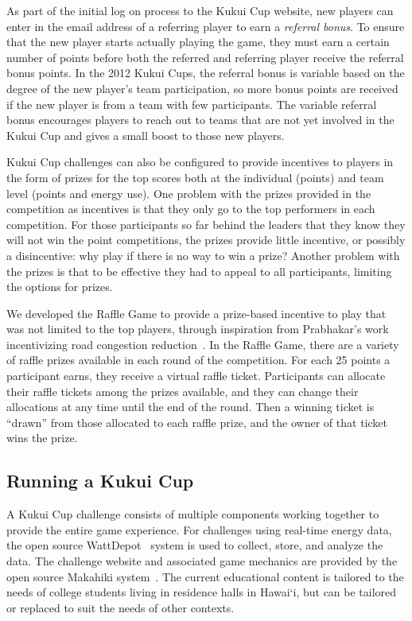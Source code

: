 \documentclass{sigchi}
\newcommand{\Hawaii}{Hawai`i\xspace}
\begin{document}
As part of the initial log on process to the Kukui Cup website, new players can enter in the email address of a referring player to earn a \emph{referral bonus}. To ensure that the new player starts actually playing the game, they must earn a certain number of points before both the referred and referring player receive the referral bonus points. In the 2012 Kukui Cups, the referral bonus is variable based on the degree of the new player's team participation, so more bonus points are received if the new player is from a team with few participants. The variable referral bonus encourages players to reach out to teams that are not yet involved in the Kukui Cup and gives a small boost to those new players.

Kukui Cup challenges can also be configured to provide incentives to players in the form of prizes for the top scores both at the individual (points) and team level (points and energy use). One problem with the prizes provided in the competition as incentives is that they only go to the top performers in each competition. For those participants so far behind the leaders that they know they will not win the point competitions, the prizes provide little incentive, or possibly a disincentive: why play if there is no way to win a prize? Another problem with the prizes is that to be effective they had to appeal to all participants, limiting the options for prizes.

We developed the Raffle Game to provide a prize-based incentive to play that was not limited to the top players, through inspiration from Prabhakar's work incentivizing road congestion reduction~\cite{Merugu2009}. In the Raffle Game, there are a variety of raffle prizes available in each round of the competition. For each 25 points a participant earns, they receive a virtual raffle ticket. Participants can allocate their raffle tickets among the prizes available, and they can change their allocations at any time until the end of the round. Then a winning ticket is ``drawn'' from those allocated to each raffle prize, and the owner of that ticket wins the prize.

\subsection{Running a Kukui Cup}

A Kukui Cup challenge consists of multiple components working together to provide the entire game experience. For challenges using real-time energy data, the open source WattDepot~\cite{csdl2-10-05} system is used to collect, store, and analyze the data. The challenge website and associated game mechanics are provided by the open source Makahiki system~\cite{csdl2-11-07}. The current educational content is tailored to the needs of college students living in residence halls in \Hawaii, but can be tailored or replaced to suit the needs of other contexts.
\end{document}
